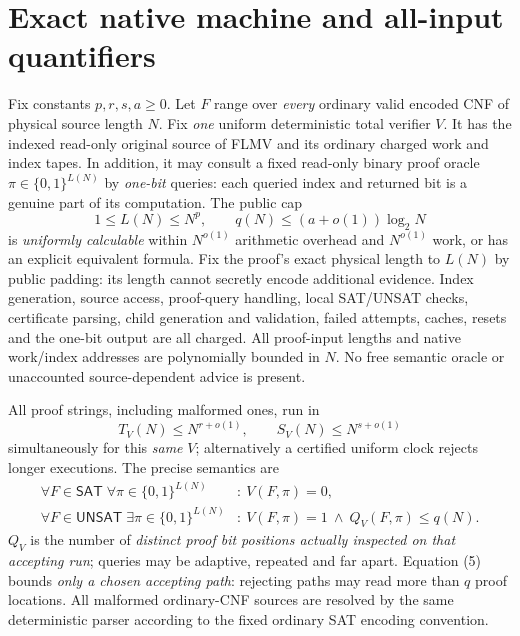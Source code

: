 \documentclass[11pt]{article}
\newcommand{\SAT}{\mathsf{SAT}}
\newcommand{\UNSAT}{\mathsf{UNSAT}}
\begin{document}
\section{Exact native machine and all-input quantifiers}
Fix constants $p,r,s,a\ge0$. Let $F$ range over \emph{every}
ordinary valid encoded CNF of physical source length $N$.
Fix \emph{one} uniform deterministic total verifier $V$.
It has the indexed read-only original source of FLMV and its
ordinary charged work and index tapes.
In addition, it may consult a fixed read-only binary proof
oracle $\pi\in\{0,1\}^{L(N)}$ by \emph{one-bit} queries:
each queried index and returned bit is a genuine part of its
computation. The public cap
\[
 1\le L(N)\le N^p,\qquad
 q(N)\le(a+o(1))\log_2N
\tag{2}
\]
is \emph{uniformly calculable} within
$N^{o(1)}$ arithmetic overhead and $N^{o(1)}$
work, or has an explicit equivalent formula. Fix the
proof's exact physical length to $L(N)$ by public padding:
its length cannot secretly encode additional evidence.
Index generation, source access, proof-query handling,
local SAT/UNSAT checks, certificate parsing, child
generation and validation, failed attempts, caches, resets
and the one-bit output are all charged.
All proof-input lengths and native work/index addresses
are polynomially bounded in $N$.
No free semantic oracle or unaccounted source-dependent
advice is present.

All proof strings, including malformed ones, run in
\[
 T_V(N)\le N^{r+o(1)},\qquad
 S_V(N)\le N^{s+o(1)}
\tag{3}
\]
simultaneously for this \emph{same} $V$; alternatively
a certified uniform clock rejects longer executions.
The precise semantics are
\begin{align}
 \forall F\in\SAT\;\forall\pi\in\{0,1\}^{L(N)}
   &:\ V(F,\pi)=0, \tag{4}\\
 \forall F\in\UNSAT\;\exists\pi\in\{0,1\}^{L(N)}
   &:\ V(F,\pi)=1
       \ \land\ Q_V(F,\pi)\le q(N). \tag{5}
\end{align}
$Q_V$ is the number of \emph{distinct proof bit positions
actually inspected on that accepting run}; queries may be
adaptive, repeated and far apart.
Equation (5) bounds \emph{only a chosen accepting path}:
rejecting paths may read more than $q$ proof locations.
All malformed ordinary-CNF sources are resolved by the
same deterministic parser according to the fixed ordinary
SAT encoding convention.
\end{document}
